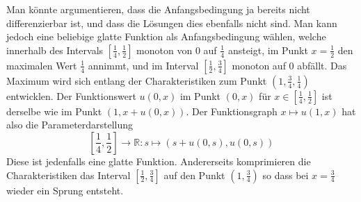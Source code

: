 Man könnte argumentieren, dass die Anfangsbedingung ja bereits nicht differenzierbar
ist, und dass die Lösungen dies ebenfalls nicht sind. Man kann
jedoch eine beliebige glatte Funktion als Anfangsbedingung wählen, welche
innerhalb des Intervals $[\frac14,\frac12]$ monoton von $0$ auf $\frac14$ 
ansteigt, im Punkt $x=\frac12$ den maximalen Wert $\frac14$ annimmt,
und im Interval $[\frac12,\frac34]$ monoton auf $0$ abfällt.
Das Maximum wird sich entlang der Charakteristiken zum Punkt
$(1,\frac34,\frac14)$ entwicklen. Der Funktionswert $u(0,x)$ im Punkt $(0,x)$
für $x\in[\frac14,\frac12]$ ist derselbe wie im Punkt $(1,x+u(0,x))$.
Der Funktionsgraph $x\mapsto u(1,x)$ hat also die Parameterdarstellung
\[
[{\textstyle\frac14},{\textstyle\frac12}]\to\mathbb R\colon s\mapsto (s+u(0,s),u(0,s))
\]
Diese ist jedenfalls eine glatte Funktion. Andererseits komprimieren
die Charakteristiken das Interval $[\frac12,\frac34]$ auf
den Punkt $(1,\frac34)$ so dass bei $x=\frac34$ wieder ein Sprung entsteht.

